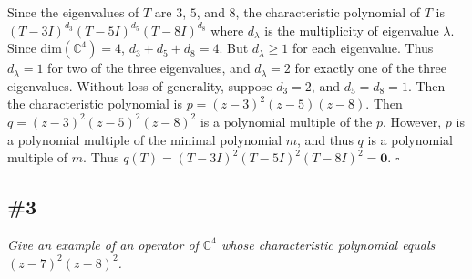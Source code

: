 \documentclass[12pt]{article}
\begin{document}
\noindent Since the eigenvalues of $T$ are $3$, $5$, and $8$, the characteristic polynomial of $T$ is $(T - 3I)^{d_3}(T - 5I)^{d_5}(T - 8I)^{d_8}$ where $d_\lambda$ is the multiplicity of eigenvalue $\lambda$.  Since $\text{dim}(\mathbb{C}^4) = 4$, $d_3 + d_5 + d_8 = 4$.  But $d_\lambda \geq 1$ for each eigenvalue.  Thus $d_\lambda = 1$ for two of the three eigenvalues, and $d_\lambda = 2$ for exactly one of the three eigenvalues.  Without loss of generality, suppose $d_3 = 2$, and $d_5 = d_8 = 1$.  Then the characteristic polynomial is $p = (z - 3)^2(z - 5)(z - 8)$.  Then $q = (z - 3)^2(z - 5)^2(z - 8)^2$ is a polynomial multiple of the $p$.  However, $p$ is a polynomial multiple of the minimal polynomial $m$, and thus $q$ is a polynomial multiple of $m$.  Thus $q(T) = (T - 3I)^2(T - 5I)^2(T - 8I)^2 = \mathbf{0}$. \hfill $\square$

\subsection*{\#3}
{\it Give an example of an operator of $\mathbb{C}^4$ whose characteristic polynomial equals $(z - 7)^2(z - 8)^2$.} \\

\end{document}
